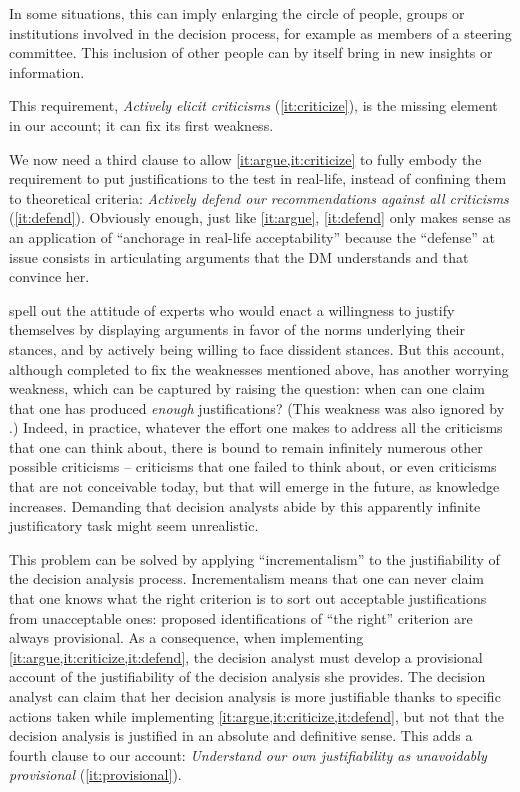 \documentclass[preprint, french, english, 11pt, authoryear]{elsarticle}%
\begin{document}
In some situations, this can imply enlarging the circle of people, groups or institutions involved in the decision process, for example as members of a steering committee.
This inclusion of other people can by itself bring in new insights or information.
  
This requirement, \emph{Actively elicit criticisms} (\ref{it:criticize}), is the missing element in our account; it can fix its first weakness.

We now need a third clause to allow \cref{it:argue,it:criticize} to fully embody the requirement to put justifications to the test in real-life, instead of confining them to theoretical criteria: \emph{Actively defend our recommendations against all criticisms} (\ref{it:defend}).
Obviously enough, just like \cref{it:argue}, \cref{it:defend} only makes sense as an application of ``anchorage in real-life acceptability'' because the ``defense'' at issue consists in articulating arguments that the \ac{DM}
 understands and that convince her.

 spell out the attitude of experts who would enact a willingness to justify themselves by displaying arguments in favor of the norms underlying their stances, and by actively being willing to face dissident stances. 
But this account, although completed to fix the weaknesses mentioned above, has another worrying weakness, which can be captured by raising the question: when can one claim that one has produced \emph{enough} justifications? (This weakness was also ignored by  \citet{meinard_what_2017}.) 
Indeed, in practice, whatever the effort one makes to address all the criticisms that one can think about, there is bound to remain infinitely numerous other possible criticisms -- criticisms that one failed to think about, or even criticisms that are not conceivable today, but that will emerge in the future, as knowledge increases. 
Demanding that decision analysts abide by this apparently infinite justificatory task might seem unrealistic. 

This problem can be solved by applying ``incrementalism'' to the justifiability of the decision analysis process. 
Incrementalism means that one can never claim that one knows what the right criterion is to sort out acceptable justifications from unacceptable ones: proposed identifications of ``the right'' criterion are always provisional. 
As a consequence, when implementing \cref{it:argue,it:criticize,it:defend}, the decision analyst must develop a provisional account of the justifiability of the decision analysis she provides. 
The decision analyst can claim that her decision analysis is more justifiable thanks to specific actions taken while implementing \cref{it:argue,it:criticize,it:defend}, but not that the decision analysis is justified in an absolute and definitive sense. 
This adds a fourth clause to our account: \emph{Understand our own justifiability as unavoidably provisional} (\ref{it:provisional}).
\end{document}
